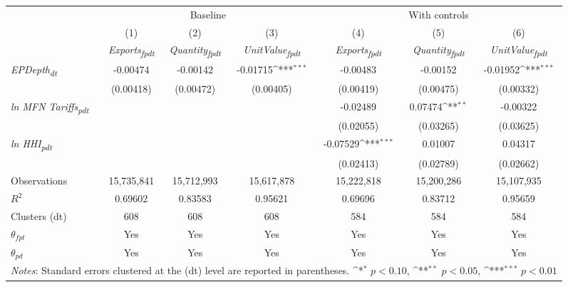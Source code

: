 {
\def\sym#1{\ifmmode^{#1}\else\(^{#1}\)\fi}
\begin{tabular}{l*{6}{c}}
\toprule
&\multicolumn{3}{c}{Baseline}&\multicolumn{3}{c}{With controls}\\\cmidrule(lr){2-4}\cmidrule(lr){5-7}
&(1)&(2)&(3)&(4)&(5)&(6)\\
&\textit{Exports\textsubscript{fpdt}}&\textit{Quantity\textsubscript{fpdt}}&\textit{UnitValue\textsubscript{fpdt}}&\textit{Exports\textsubscript{fpdt}}&\textit{Quantity\textsubscript{fpdt}}&\textit{UnitValue\textsubscript{fpdt}}\\
\midrule
\textit{EPDepth\textsubscript{dt}} & -0.00474 & -0.00142 & -0.01715\sym{***} & -0.00483 & -0.00152 & -0.01952\sym{***}\\
 & (0.00418) & (0.00472) & (0.00405) & (0.00419) & (0.00475) & (0.00332)\\
\addlinespace
\textit{ln MFN Tariffs\textsubscript{pdt}} &  &  &  & -0.02489 & 0.07474\sym{**} & -0.00322\\
 &  &  &  & (0.02055) & (0.03265) & (0.03625)\\
\addlinespace
\textit{ln HHI\textsubscript{pdt}} &  &  &  & -0.07529\sym{***} & 0.01007 & 0.04317\\
 &  &  &  & (0.02413) & (0.02789) & (0.02662)\\
\midrule
Observations & 15,735,841 & 15,712,993 & 15,617,878 & 15,222,818 & 15,200,286 & 15,107,935\\
$R^{2}$ & 0.69602 & 0.83583 & 0.95621 & 0.69696 & 0.83712 & 0.95659\\
Clusters (dt) & 608 & 608 & 608 & 584 & 584 & 584\\
$\theta_{fpt}$ & Yes & Yes & Yes & Yes & Yes & Yes\\
$\theta_{pd}$ & Yes & Yes & Yes & Yes & Yes & Yes\\
\bottomrule
\multicolumn{7}{l}{\footnotesize \textit{Notes}: Standard errors clustered at the (dt) level are reported in parentheses. \sym{*} \(p<0.10\), \sym{**} \(p<0.05\), \sym{***} \(p<0.01\)}\\
\end{tabular}
}
